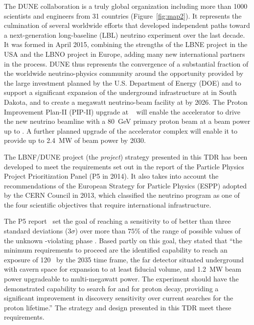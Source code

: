 The DUNE collaboration is a truly global organization including more than \num{1000} scientists and engineers from \num{31} countries (Figure~\ref{fig:map2}). It represents the culmination of several worldwide efforts that developed independent paths toward a next-generation long-baseline (LBL) neutrino experiment over the last decade. It was formed in April 2015, combining the strengths of the LBNE project in the USA and the LBNO project in Europe, adding many new international partners in the process. DUNE thus represents the convergence of a substantial fraction of the worldwide neutrino-physics community around the opportunity provided by the large investment planned by the U.S. Department of Energy (DOE) and \fnal to support a significant expansion of the underground infrastructure at \surf in South Dakota, and to create a megawatt neutrino-beam facility at \fnal by 2026. The Proton Improvement Plan-II (PIP-II) upgrade at \fnal~\cite{pip2-2013} will enable the accelerator to drive the new neutrino beamline with a \SI{80}{\GeV} primary proton beam at a beam power %
up to \pipiibeampower{}. A further planned upgrade 
of the accelerator complex will enable it to provide up to \SI{2.4}{\MW} of beam power by 2030. 

The LBNF/DUNE project (the \textit{project}) strategy presented in this TDR has been developed to meet the requirements set out in the report of the Particle Physics Project Prioritization Panel (P5 in 2014). It also takes into account the recommendations of the European Strategy for Particle  Physics (ESPP) adopted by the CERN Council in 2013, which classified the  neutrino program as one of the four scientific objectives that require international infrastructure.

The P5 report~\cite{p5report} set the goal of reaching a sensitivity to  of better than three standard deviations (\num{3}$\sigma$) over more than $75\%$ 
of the range of possible values of the unknown -violating phase \deltacp.
Based partly on this goal, they stated that ``the 
minimum requirements to proceed are the identified capability to reach an exposure 
of \num{120}~\ktMWyr{} by the 2035 time frame, the far detector situated underground 
with cavern space for expansion to at least \fdfiducialmass \lar fiducial volume, and \SI{1.2}{MW} 
beam power upgradeable to multi-megawatt power.
The experiment should have the demonstrated 
capability to search for  and for proton decay, providing a significant 
improvement in discovery sensitivity over current searches for the proton lifetime.'' The strategy and design presented in this TDR meet these requirements.


